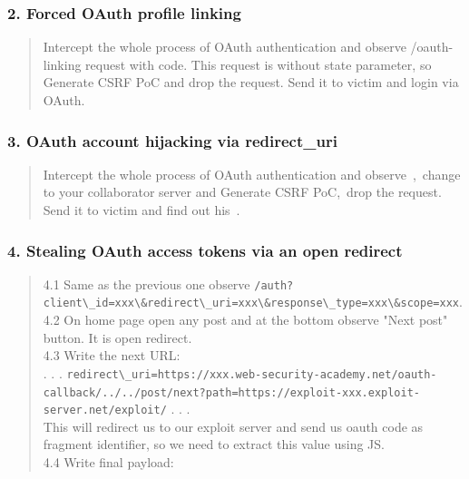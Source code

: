 \documentclass[
  letterpaper,
]{article}
\newcommand{\passthrough}[1]{#1}
\begin{document}
\subsubsection{2. Forced OAuth profile
linking}\label{2-forced-oauth-profile-linking}

\begin{quote}
Intercept the whole process of OAuth authentication and observe
/oauth-linking request with code. This request is without state
parameter, so Generate CSRF PoC and drop the request. Send it to victim
and login via OAuth.
\end{quote}

\subsubsection{3. OAuth account hijacking via
redirect\_uri}\label{3-oauth-account-hijacking-via-redirect_uri}

\begin{quote}
Intercept the whole process of OAuth authentication and observe\
,\
change  to your collaborator server and Generate CSRF PoC,\
drop the request. Send it to victim and find out his\
.
\end{quote}

\subsubsection{4. Stealing OAuth access tokens via an open
redirect}\label{4-stealing-oauth-access-tokens-via-an-open-redirect}

\begin{quote}
4.1 Same as the previous one observe
\passthrough{\lstinline!/auth?client\_id=xxx\&redirect\_uri=xxx\&response\_type=xxx\&scope=xxx!}.\\
4.2 On home page open any post and at the bottom observe "Next post"
button. It is open redirect.\\
4.3 Write the next URL:\\
. . .
\passthrough{\lstinline!redirect\_uri=https://xxx.web-security-academy.net/oauth-callback/../../post/next?path=https://exploit-xxx.exploit-server.net/exploit/!}
. . .\\
This will redirect us to our exploit server and send us oauth code as
fragment identifier, so we need to extract this value using JS.\\
4.4 Write final payload:
\end{quote}
\end{document}

